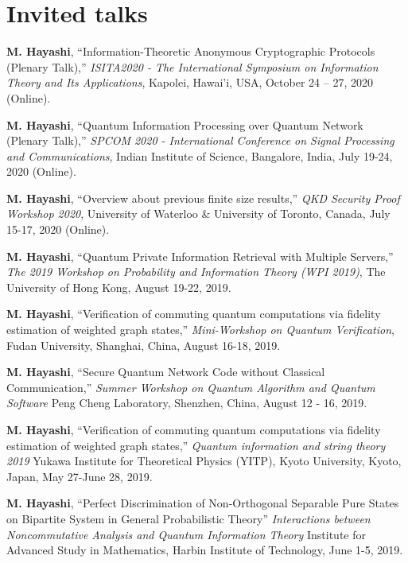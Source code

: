 \documentclass[a4paper,12pt,oneside]{article}
\begin{document}
\section{Invited talks}
\begin{enumerate}

\textbf{M. Hayashi}, 
``Information-Theoretic Anonymous Cryptographic Protocols (Plenary Talk),'' 
{\em  ISITA2020 - The International Symposium on Information Theory and Its Applications}, 
Kapolei, Hawai’i, USA, October 24 -- 27, 2020 (Online). 

\textbf{M. Hayashi}, 
``Quantum Information Processing over Quantum Network (Plenary Talk),'' 
{\em  SPCOM 2020 - International Conference on Signal Processing and Communications}, 
Indian Institute of Science, Bangalore, India, July 19-24, 2020 (Online). 

\textbf{M. Hayashi}, 
``Overview about previous finite size results,''
{\em  QKD Security Proof Workshop 2020}, 
University of Waterloo \& University of Toronto,
Canada, July 15-17, 2020 (Online). 

\textbf{M. Hayashi}, 
``Quantum Private Information Retrieval with Multiple Servers,''
{\em  The 2019 Workshop on Probability and Information Theory (WPI 2019)},
The University of Hong Kong, 
August 19-22, 2019. 

\textbf{M. Hayashi}, 
``Verification of commuting quantum computations via fidelity estimation of weighted graph states,''
{\em Mini-Workshop on Quantum Verification}, 
Fudan University, Shanghai, China,
August 16-18, 2019.

\textbf{M. Hayashi}, 
``Secure Quantum Network Code without Classical Communication,''
{\em  Summer Workshop on Quantum Algorithm and Quantum Software}
Peng Cheng Laboratory, Shenzhen, China,
August 12 - 16, 2019.

\textbf{M. Hayashi}, 
``Verification of commuting quantum computations via fidelity estimation of weighted graph states,''
{\em  Quantum information and string theory 2019}
Yukawa Institute for Theoretical Physics (YITP), Kyoto University, Kyoto, Japan,
May 27-June 28, 2019.

\textbf{M. Hayashi}, 
``Perfect Discrimination of Non-Orthogonal Separable Pure States on Bipartite System in General Probabilistic Theory''
{\em  Interactions between Noncommutative Analysis and Quantum Information Theory}
Institute for Advanced Study in Mathematics, Harbin Institute of Technology,
June 1-5, 2019.


\end{enumerate}
\end{document}
